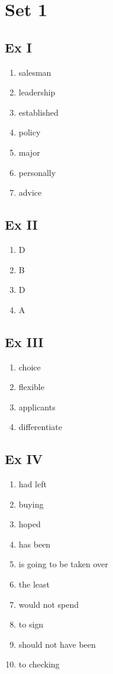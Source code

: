 \documentclass{article}
\author{Kacper Filipek}
\begin{document}
    \begin{center}
        {\bfseries\Large\theauthor}
    \end{center}

    \section*{Set 1}
        \subsection*{Ex I}
        \begin{enumerate}
            \item salesman 
            \item leadership
            \item established
            \item policy
            \item major
            \item personally
            \item advice
        \end{enumerate}
        \subsection*{Ex II}
        \begin{enumerate}
            \item D
            \item B
            \item D
            \item A
        \end{enumerate}
        \subsection*{Ex III}
        \begin{enumerate}
            \item choice
            \item flexible
            \item applicants
            \item differentiate
        \end{enumerate}
        \subsection*{Ex IV}
        \begin{enumerate}
            \item had left
            \item buying
            \item hoped
            \item has been
            \item is going to be taken over
            \item the least
            \item would not spend
            \item to sign
            \item should not have been
            \item to checking
        \end{enumerate}
\end{document}
